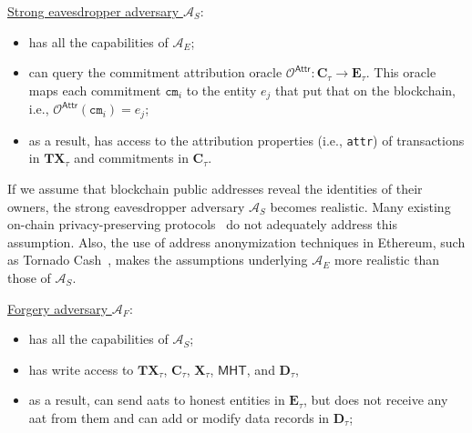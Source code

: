 \noindent \underline{Strong eavesdropper adversary  $\mathcal{A}_S$}:
\begin{itemize}
	\item has all the capabilities of $\mathcal{A}_E$;
	\item can query the commitment attribution oracle $\mathcal{O}^\mathsf{Attr} : \mathbf{C}_\tau \rightarrow \mathbf{E}_\tau$. This oracle maps each commitment $\texttt{cm}_i$ to the entity $e_j$ that put that on the blockchain,  i.e., $\mathcal{O}^\mathsf{Attr}(\texttt{cm}_i) = e_j$;
	\item as a result, has access to the attribution properties (i.e., \texttt{attr}) of transactions in $\mathbf{TX}_\tau$ and commitments in $\mathbf{C}_\tau$.
\end{itemize}
If we assume that blockchain public addresses reveal the identities of their owners, the strong eavesdropper adversary $\mathcal{A}_S$ becomes realistic. Many existing on-chain privacy-preserving protocols~\cite{altawy2019mesh,ZEXE,zkLedger2018,ZeeStar} do not adequately address this assumption. Also, the use of address anonymization techniques in Ethereum, such as Tornado Cash~\cite{pertsev2019tornado}, makes the assumptions underlying  $\mathcal{A}_E$ more realistic than those of $\mathcal{A}_S$.



\noindent \underline{Forgery adversary $\mathcal{A}_F$}:
\begin{itemize}
	\item has all the capabilities of $\mathcal{A}_S$;
	\item has write access to $\mathbf{TX}_\tau$, $\mathbf{C}_\tau$, $\mathbf{X}_\tau$, $\mathsf{MHT}$, and $\mathbf{D}_\tau$,
	\item as a result, can send  \glspl{aat} to honest entities in  $\mathbf{E}_\tau$, but does not receive any \gls{aat} from them and can add or modify data records in $\mathbf{D}_\tau$;
\end{itemize}


